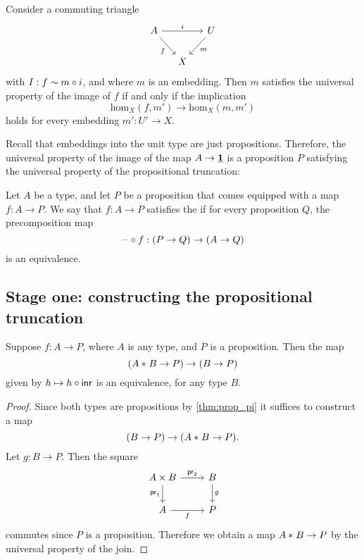 \begin{cor}\label{cor:image_up}
Consider a commuting triangle
\begin{equation*}
\begin{tikzcd}[column sep=small]
A \arrow[rr,"i"] \arrow[dr,swap,"f"] & & U \arrow[dl,"m"] \\
& X
\end{tikzcd}
\end{equation*}
with $I:f\sim m\circ i$, and where $m$ is an embedding. Then $m$ satisfies the universal property of the image of $f$ if and only if the implication
\begin{equation*}
\mathrm{hom}_X(f,m')\to\mathrm{hom}_X(m,m')
\end{equation*}
holds for every embedding $m':U'\to X$. 
\end{cor}

Recall that embeddings into the unit type are just propositions.
Therefore, the universal property of the image of the map $A\to\underline{\mathbf{1}}$ is a proposition $P$ satisfying the universal property of the propositional truncation:

\begin{defn}
Let $A$ be a type, and let $P$ be a proposition that comes equipped with a map $f:A\to P$. We say that $f:A\to P$ satisfies the  if for every proposition $Q$, the precomposition map
\begin{equation*}
\mathord{\hspace{1pt}\text{--}\hspace{1pt}}\circ f:(P\to Q)\to (A\to Q)
\end{equation*}
is an equivalence.
\end{defn}

\subsection{Stage one: constructing the propositional truncation}

\begin{lem}\label{lem:extend_join_prop}
Suppose $f:A\to P$, where $A$ is any type, and $P$ is a proposition.
Then the map
\begin{equation*}
({A}\ast_{}{B}\to P)\to (B\to P)
\end{equation*}
given by $h\mapsto h\circ {\mathsf{inr}}$ is an equivalence, for any type $B$.
\end{lem}

\begin{proof}
Since both types are propositions by \cref{thm:prop_pi} it suffices to construct a map
\begin{equation*}
(B\to P)\to ({A}\ast_{}{B}\to P).
\end{equation*}
Let $g:B\to P$. Then the square
\begin{equation*}
\begin{tikzcd}
A\times B \arrow[r,"\proj 2"] \arrow[d,swap,"\proj 1"] & B \arrow[d,"g"] \\
A \arrow[r,swap,"f"] & P
\end{tikzcd}
\end{equation*}
commutes since $P$ is a proposition. Therefore we obtain a map ${A}\ast_{}{B}\to P$ by the universal property of the join.
\end{proof}

